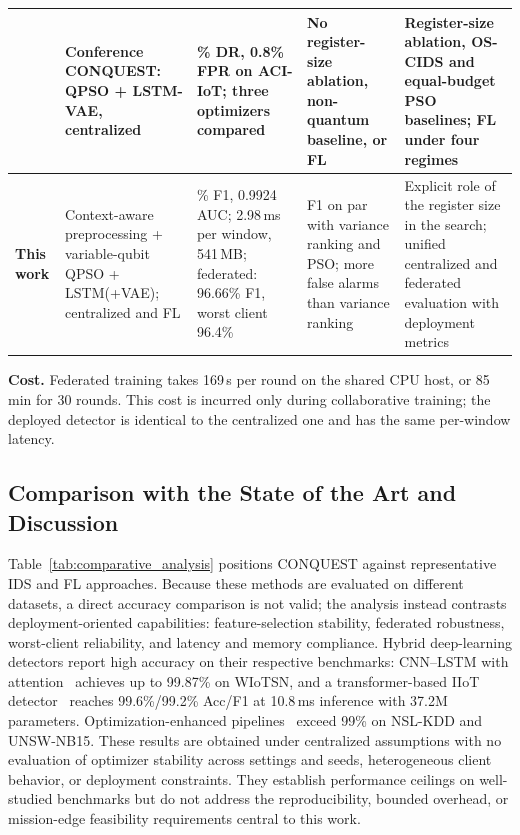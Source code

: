 \documentclass[conference]{IEEEtran}
\begin{document}
\begin{table}[!t]
\begin{tabular}{>{\raggedright\arraybackslash}p{1.0cm} >{\raggedright\arraybackslash}p{2.6cm} >{\raggedright\arraybackslash}p{4.0cm} >{\raggedright\arraybackslash}p{3.2cm} >{\raggedright\arraybackslash}p{4.4cm}}
\midrule
\cite{ajakweconquest} & Conference CONQUEST: QPSO + LSTM-VAE, centralized & 97.5\% DR, 0.8\% FPR on ACI-IoT; three optimizers compared & No register-size ablation, non-quantum baseline, or FL & Register-size ablation, OS-CIDS and equal-budget PSO baselines; FL under four regimes \\
\midrule
\textbf{This work} & Context-aware preprocessing + variable-qubit QPSO + LSTM(+VAE); centralized and FL & 97.13\% F1, 0.9924 AUC; 2.98\,ms per window, 541\,MB; federated: 96.66\% F1, worst client 96.4\% & F1 on par with variance ranking and PSO; more false alarms than variance ranking & Explicit role of the register size in the search; unified centralized and federated evaluation with deployment metrics \\
\hline\toprule
\end{tabular}
\end{table}

\textbf{Cost.} Federated
training takes 169\,s per round on the shared CPU host, or 85\,min for
30 rounds. This cost is incurred only during collaborative training;
the deployed detector is identical to the centralized one and has the
same per-window latency.




\subsection{Comparison with the State of the Art and Discussion}
\label{subsec:comparative_analysis}

Table~\ref{tab:comparative_analysis} positions CONQUEST against
representative IDS and FL approaches. Because these methods are
evaluated on different datasets, a direct accuracy comparison is not
valid; the analysis instead contrasts deployment-oriented
capabilities: feature-selection stability, federated robustness,
worst-client reliability, and latency and memory compliance.
Hybrid deep-learning detectors report high accuracy on their
respective benchmarks: CNN--LSTM with
attention~\cite{phalaagaehybrid} achieves up to 99.87\% on
WIoTSN, and a transformer-based IIoT
detector~\cite{yuadaptive} reaches 99.6\%/99.2\% Acc/F1 at
10.8\,ms inference with 37.2M parameters.
Optimization-enhanced pipelines~\cite{donkoloptimization,shrivashybrid}
exceed 99\% on NSL-KDD and UNSW-NB15. These results are
obtained under centralized assumptions with no evaluation of
optimizer stability across settings and seeds, heterogeneous client behavior,
or deployment constraints. They establish performance
ceilings on well-studied benchmarks but do not address the
reproducibility, bounded overhead, or mission-edge feasibility
requirements central to this work.
\end{document}
